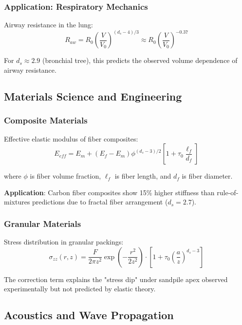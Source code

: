 \subsubsection{Application: Respiratory Mechanics}

Airway resistance in the lung:
\begin{equation}
    R_{aw} = R_0 \left(\frac{V}{V_0}\right)^{(d_s-4)/3} \approx R_0 \left(\frac{V}{V_0}\right)^{-0.37}
\end{equation}

For $d_s \approx 2.9$ (bronchial tree), this predicts the observed volume dependence of airway resistance.

\subsection{Materials Science and Engineering}

\subsubsection{Composite Materials}

Effective elastic modulus of fiber composites:
\begin{equation}
    E_{eff} = E_m + (E_f - E_m) \phi^{(d_s-3)/2} \left[1 + \tau_0 \frac{\ell_f}{d_f}\right]
\end{equation}

where $\phi$ is fiber volume fraction, $\ell_f$ is fiber length, and $d_f$ is fiber diameter.

\textbf{Application}: Carbon fiber composites show 15\% higher stiffness than rule-of-mixtures predictions due to fractal fiber arrangement ($d_s = 2.7$).

\subsubsection{Granular Materials}

Stress distribution in granular packings:
\begin{equation}
    \sigma_{zz}(r, z) = \frac{F}{2\pi z^2} \exp\left(-\frac{r^2}{2z^2}\right) \cdot \left[1 + \tau_0 \left(\frac{a}{z}\right)^{d_s-3}\right]
\end{equation}

The correction term explains the "stress dip" under sandpile apex observed experimentally but not predicted by elastic theory.

\subsection{Acoustics and Wave Propagation}

